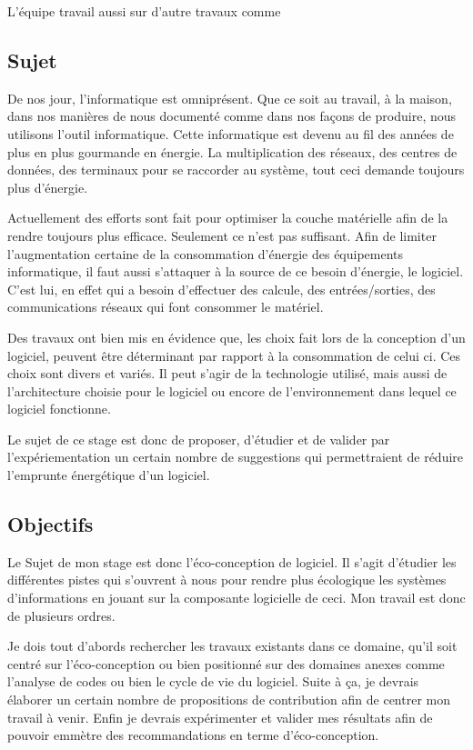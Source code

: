 \documentclass[a4paper, 11pt]{report}
\begin{document}
L'équipe travail aussi sur d'autre travaux comme 



\subsection{Sujet}
De nos jour, l'informatique est omniprésent. Que ce soit au travail, à la maison, dans nos manières de nous documenté comme dans nos façons de produire, nous utilisons l'outil informatique. Cette informatique est devenu au fil des années de plus en plus gourmande en énergie. La multiplication des réseaux, des centres de données, des terminaux pour se raccorder au système, tout ceci demande toujours plus d'énergie.

Actuellement des efforts sont fait pour optimiser la couche matérielle afin de la rendre toujours plus efficace. Seulement ce n'est pas suffisant. Afin de limiter l'augmentation certaine de la consommation d'énergie des équipements informatique, il faut aussi s'attaquer à la source de ce besoin d'énergie, le logiciel. C'est lui, en effet qui a besoin d'effectuer des calcule, des entrées/sorties, des communications réseaux qui font consommer le matériel.

Des travaux ont bien mis en évidence que, les choix fait lors de la conception d'un logiciel, peuvent être déterminant par rapport à la consommation de celui ci. Ces choix sont divers et variés. Il peut s'agir de la technologie utilisé, mais aussi de l'architecture choisie pour le logiciel ou encore de l'environnement dans lequel ce logiciel fonctionne.

Le sujet de ce stage est donc de proposer, d'étudier et de valider par l'expériementation un certain nombre de suggestions qui permettraient de réduire l'emprunte énergétique d'un logiciel.

\subsection{Objectifs}
Le Sujet de mon stage est donc l'éco-conception de logiciel. Il s'agit d'étudier les différentes pistes qui s'ouvrent à nous pour rendre plus écologique les systèmes d'informations en jouant sur la composante logicielle de ceci. Mon travail est donc de plusieurs ordres.

Je dois tout d'abords rechercher les travaux existants dans ce domaine, qu'il soit centré sur l'éco-conception ou bien positionné sur des domaines anexes comme l'analyse de codes ou bien le cycle de vie du logiciel. Suite à ça, je devrais élaborer un certain nombre de propositions de contribution afin de centrer mon travail à venir. Enfin je devrais expérimenter et valider mes résultats afin de pouvoir emmètre des recommandations en terme d'éco-conception.
\end{document}
